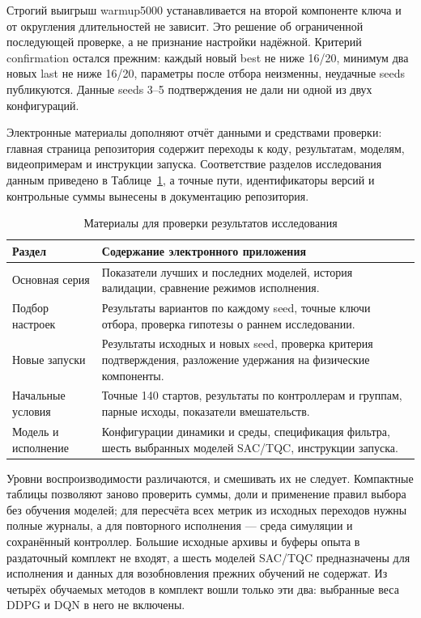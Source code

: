 Строгий выигрыш warmup5000 устанавливается на второй компоненте ключа и от округления длительностей не зависит. Это решение об ограниченной последующей проверке, а не признание настройки надёжной. Критерий confirmation остался прежним: каждый новый best не ниже 16/20, минимум два новых last не ниже 16/20, параметры после отбора неизменны, неудачные seeds публикуются. Данные seeds 3–5 подтверждения не дали ни одной из двух конфигураций.

\label{app:repro}
Электронные материалы дополняют отчёт данными и средствами проверки: главная страница репозитория содержит переходы к коду, результатам, моделям, видеопримерам и инструкции запуска. Соответствие разделов исследования данным приведено в Таблице~\ref{tab:evidence}, а точные пути, идентификаторы версий и контрольные суммы вынесены в документацию репозитория.
\begin{table}[htbp]\caption{Материалы для проверки результатов исследования}\label{tab:evidence}
\begin{smalltable}\begin{tabularx}{\linewidth}{@{}p{32mm}X@{}}\toprule
Раздел & Содержание электронного приложения\\\midrule
Основная серия & Показатели лучших и последних моделей, история валидации, сравнение режимов исполнения.\\
Подбор настроек & Результаты вариантов по каждому seed, точные ключи отбора, проверка гипотезы о раннем исследовании.\\
Новые запуски & Результаты исходных и новых seed, проверка критерия подтверждения, разложение удержания на физические компоненты.\\
Начальные условия & Точные 140 стартов, результаты по контроллерам и группам, парные исходы, показатели вмешательств.\\
Модель и исполнение & Конфигурации динамики и среды, спецификация фильтра, шесть выбранных моделей SAC/TQC, инструкции запуска.\\\bottomrule
\end{tabularx}\end{smalltable}\end{table}

Уровни воспроизводимости различаются, и смешивать их не следует. Компактные таблицы позволяют заново проверить суммы, доли и применение правил выбора без обучения моделей; для пересчёта всех метрик из исходных переходов нужны полные журналы, а для повторного исполнения — среда симуляции и сохранённый контроллер. Большие исходные архивы и буферы опыта в раздаточный комплект не входят, а шесть моделей SAC/TQC предназначены для исполнения и данных для возобновления прежних обучений не содержат. Из четырёх обучаемых методов в комплект вошли только эти два: выбранные веса DDPG и DQN в него не включены.

